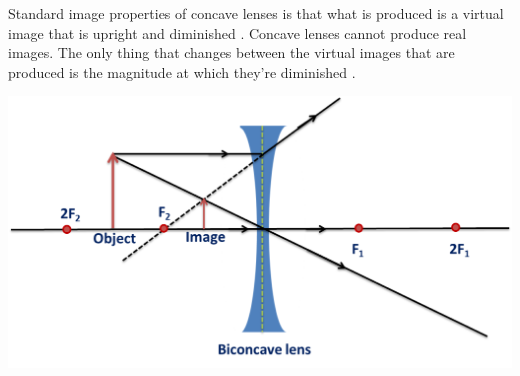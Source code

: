 \documentclass[12pt]{article}
\begin{document}
Standard image properties of concave lenses is that what is produced is a virtual image that is upright and diminished
\cite{geekconcave}.
Concave lenses cannot produce real images. The only thing that changes between the virtual images that are produced is the magnitude at which they're diminished
\cite{topprlensimage,geekconcave}.

\begin{minipage}{.5\textwidth}
    \captionsetup{hypcap=false}
    \centering
    \includegraphics[width=.9\linewidth]{concave.png}
    \label{fig:concaveimage}
\end{minipage}
\hfill
\end{document}
